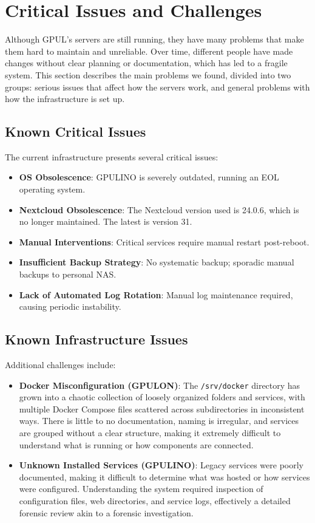 \section{Critical Issues and Challenges}

Although GPUL's servers are still running, they have many problems that make them hard to maintain and unreliable. Over time, different people have made changes without clear planning or documentation, which has led to a fragile system. This section describes the main problems we found, divided into two groups: serious issues that affect how the servers work, and general problems with how the infrastructure is set up.

\subsection*{Known Critical Issues}

The current infrastructure presents several critical issues:
\begin{itemize}
  \item \textbf{OS Obsolescence}: GPULINO is severely outdated, running an EOL operating system.
  \item \textbf{Nextcloud Obsolescence}: The Nextcloud version used is 24.0.6, which is no longer maintained. The latest is version 31.
  \item \textbf{Manual Interventions}: Critical services require manual restart post-reboot.
  \item \textbf{Insufficient Backup Strategy}: No systematic backup; sporadic manual backups to personal NAS.
  \item \textbf{Lack of Automated Log Rotation}: Manual log maintenance required, causing periodic instability.
\end{itemize}

\subsection*{Known Infrastructure Issues}

Additional challenges include:
\begin{itemize}
  \item \textbf{Docker Misconfiguration (GPULON)}: The \texttt{/srv/docker} directory has grown into a chaotic collection of loosely organized folders and services, with multiple Docker Compose files scattered across subdirectories in inconsistent ways. There is little to no documentation, naming is irregular, and services are grouped without a clear structure, making it extremely difficult to understand what is running or how components are connected.
  \item \textbf{Unknown Installed Services (GPULINO)}: Legacy services were poorly documented, making it difficult to determine what was hosted or how services were configured. Understanding the system required inspection of configuration files, web directories, and service logs, effectively a detailed forensic review akin to a forensic investigation.
\end{itemize}

